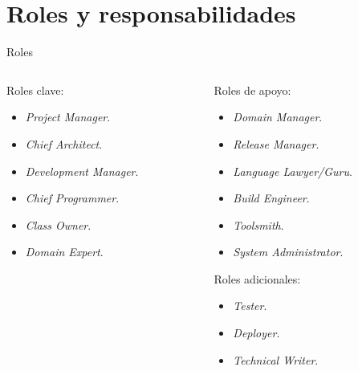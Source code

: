 \documentclass[12pt]{beamer}
\begin{document}

\section{Roles y responsabilidades}\label{rol}
\begin{frame}[fragile]{Roles}
  \begin{columns}
    \begin{column}{0.6\textwidth}
Roles clave:
\begin{itemize}
\item \textit{Project Manager}.
\item \textit{Chief Architect}.
\item \textit{Development Manager}.
\item \textit{Chief Programmer}. 
\item \textit{Class Owner}. 
\item \textit{Domain Expert}.
\end{itemize}
\end{column}

\begin{column}{0.4\textwidth}
  
  \footnotesize
  \vspace{0.5cm}
Roles de apoyo:
\begin{itemize}\footnotesize
\item \textit{Domain Manager}.
\item \textit{Release Manager}.
\item \textit{Language Lawyer/Guru}.
\item \textit{Build Engineer}. 
\item \textit{Toolsmith}. 
\item \textit{System Administrator}.
\end{itemize}

Roles adicionales:

\begin{itemize}\footnotesize
\item \textit{Tester}.
\item \textit{Deployer}. 
\item \textit{Technical Writer}.
\end{itemize}
\end{column}
\end{columns}
\end{frame}
\end{document}
